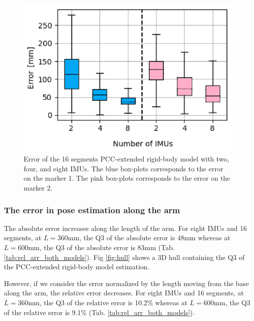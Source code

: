 \begin{figure}[ht!]
    \centering
    \includegraphics[width=\linewidth]{fig/pcc16.png}
    \caption{Error of the 16 segments PCC-extended rigid-body model with two, four, and eight IMUs. The blue box-plots corresponds to the error on the marker 1. The pink box-plots corresponds to the error on the marker 2.}
    \label{fig:err_pcc16_model}
\end{figure}

\subsubsection{The error in pose estimation along the arm}
The absolute error increases along the length of the arm. For eight IMUs and 16 segments, at $L=360$mm, the Q3 of the absolute error is $48$mm whereas at $L=600$mm, the Q3 of the absolute error is $83$mm (Tab. \ref{tab:rel_arr_both_models}).
Fig \ref{fig:hull} shows a 3D hull containing the Q3 of the PCC-extended rigid-body model estimation.

However, if we consider the error normalized by the length moving from the base along the arm, the relative error decreases. For eight IMUs and 16 segments, at $L=360$mm, the Q3 of the relative error is 10.2\% whereas at $L=600$mm, the Q3 of the relative error is 9.1\% (Tab. \ref{tab:rel_arr_both_models}).

